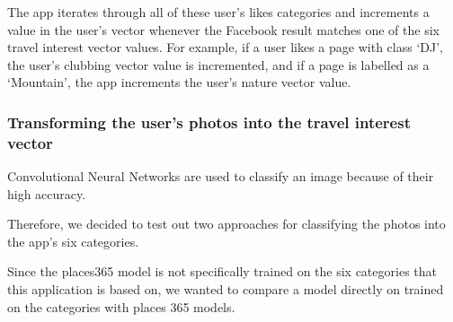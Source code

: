 The app iterates through
all of these user's likes categories and increments a value in the user's
vector whenever the Facebook result matches one of the six travel interest
vector values. For example, if a user likes a page with class `DJ', the user's
clubbing vector value is incremented, and if a page is labelled as a
`Mountain', the app increments the user's nature vector value.

\subsubsection{Transforming the user's photos into the travel interest vector}


Convolutional Neural Networks are used to classify an
image because of their high accuracy.\@

Therefore, we decided to test out two approaches for
classifying the photos into the app's six categories. 

Since the places365 model is not specifically trained
on the six categories that this application is based
on, we wanted to compare a model directly on trained
on the categories with places 365 models. 	

